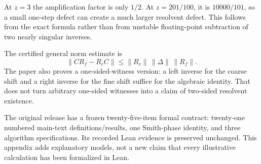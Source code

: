 
At $z=3$ the amplification factor is only $1/2$. At $z=201/100$, it is $10000/101$, so a small one-step defect can create a much larger resolvent defect. This follows from the exact formula rather than from unstable floating-point subtraction of two nearly singular inverses.

The certified general norm estimate is
\[
\|CR_f-R_cC\|
\le \|R_c\|\,\|\Delta\|\,\|R_f\|.
\]
The paper also proves a one-sided-witness version: a left inverse for the coarse shift and a right inverse for the fine shift suffice for the algebraic identity. That does not turn arbitrary one-sided witnesses into a claim of two-sided resolvent existence.


The original release has a frozen twenty-five-item formal contract: twenty-one numbered main-text definitions/results, one Smith-phase identity, and three algorithm specifications. Its recorded Lean evidence is preserved unchanged. This appendix adds explanatory models, not a new claim that every illustrative calculation has been formalized in Lean.


